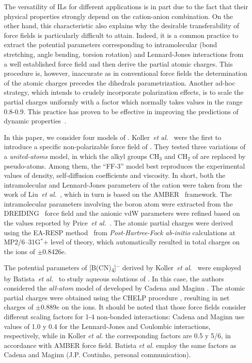 \documentclass[3p,twocolumn]{elsarticle}
\begin{document}
The versatility of ILs for different applications is in part due to the fact that their physical properties strongly depend on the cation-anion combination. On the other hand, this characteristic also explains why the desirable transferability of force fields is particularly difficult to attain. Indeed, it is a common practice to extract the potential parameters corresponding to intramolecular (bond stretching, angle bending, torsion rotation) and Lennard-Jones interactions from a well established force field and then derive the partial atomic charges. This procedure is, however, inaccurate as in conventional force fields the determination of the atomic charges precedes the dihedrals parametrization. Another ad-hoc strategy, which intends to crudely incorporate polarization effects, is to scale the partial charges uniformly with a factor which normally takes values in the range 0.8-0.9. This practice has proven to be effective in improving the predictions of dynamic properties~\cite{Schr_der_2012}.

In this paper, we consider four models of \ce{[emim][B(CN)_4]}. Koller~\textit{et al.}~\cite{Koller_2012} were the first to introduce a specific non-polarizable force field of \ce{[emim][B(CN)_4]}. They tested three variations of a \textit{united-atoms} model, in which the alkyl groups $\text{CH}_3$ and $\text{CH}_2$ of \ce{[emim]^+} are replaced by pseudo-atoms. Among them, the ``FF-3'' model best reproduces the experimental values of density, self-diffusion coefficients and viscosity. In short, both the intramolecular and Lennard-Jones parameters of the cation were taken from the work of Liu~\textit{et al.}~\cite{Liu_2006}, which in turn is based on the AMBER~\cite{Cornell_1995} framework. The intramolecular parameters involving the boron atom were extracted from the DREIDING~\cite{Mayo_1990} force field and the anionic vdW parameters were refined based on the values reported by Price~\textit{et al.}~\cite{Price_2001}. The atomic partial charges were derived using the EA-RESP method~\cite{Basma_2001} from \textit{Post-Hartree-Fock ab-initio} calculations at MP2/6–31G$^\ast$+ level of theory, which automatically resulted in total charges on the ions of $\pm$0.8426e. 

The potential parameters of [B(CN)\textsubscript{4}]$^{-}$ derived by Koller~\textit{et al.}~\cite{Koller_2012} were employed by Batista~\textit{et al.}~\cite{Batista_2015} to study aqueous solutions of \ce{[emim][B(CN)_4]}. In this case,  the authors considered the \textit{all-atom} model of \ce{[emim]^+} developed by Cadena and Maginn \cite{Cadena_2006}. The atomic partial charges were obtained using the CHELP procedure \cite{Breneman_1990}, resulting in net charges of $\pm$0.889$e$ on the ions. It should be noted that those force fields consider different scaling factors for 1-4 non-bonded interactions: Cadena and Maginn \cite{Cadena_2006} use values of 1.0 y 0.4 for the Lennard-Jones and Coulombic interactions, respectively, while in Koller \textit{et al.} \cite{Koller_2012} the corresponding factors are 0.5 y 5/6, in accordance with AMBER force field. Batista \textit{et al.} \cite{Batista_2015} employ the same factors as Cadena and Maginn \cite{Cadena_2006} (J.P. Coutinho, personal communication).
\end{document}
